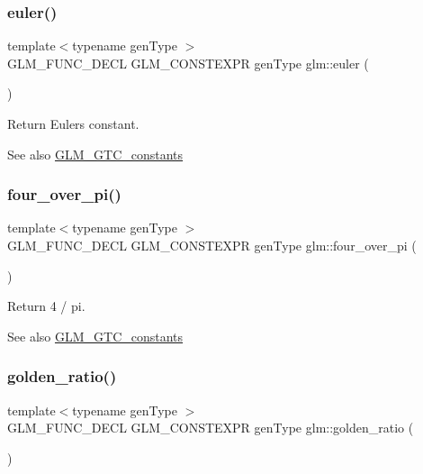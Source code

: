 \subsubsection{\texorpdfstring{euler()}{euler()}}
{\footnotesize\ttfamily template$<$typename gen\+Type $>$ \\
G\+L\+M\+\_\+\+F\+U\+N\+C\+\_\+\+D\+E\+CL G\+L\+M\+\_\+\+C\+O\+N\+S\+T\+E\+X\+PR gen\+Type glm\+::euler (\begin{DoxyParamCaption}{ }\end{DoxyParamCaption})}

Return Euler\textquotesingle{}s constant. \begin{DoxySeeAlso}{See also}
\hyperlink{group__gtc__constants}{G\+L\+M\+\_\+\+G\+T\+C\+\_\+constants} 
\end{DoxySeeAlso}
\mbox{\label{group__gtc__constants_ga753950e5140e4ea6a88e4a18ba61dc09}} 
\subsubsection{\texorpdfstring{four\+\_\+over\+\_\+pi()}{four\_over\_pi()}}
{\footnotesize\ttfamily template$<$typename gen\+Type $>$ \\
G\+L\+M\+\_\+\+F\+U\+N\+C\+\_\+\+D\+E\+CL G\+L\+M\+\_\+\+C\+O\+N\+S\+T\+E\+X\+PR gen\+Type glm\+::four\+\_\+over\+\_\+pi (\begin{DoxyParamCaption}{ }\end{DoxyParamCaption})}

Return 4 / pi. \begin{DoxySeeAlso}{See also}
\hyperlink{group__gtc__constants}{G\+L\+M\+\_\+\+G\+T\+C\+\_\+constants} 
\end{DoxySeeAlso}
\mbox{\label{group__gtc__constants_ga748cf8642830657c5b7eae04d0a80899}} 
\subsubsection{\texorpdfstring{golden\+\_\+ratio()}{golden\_ratio()}}
{\footnotesize\ttfamily template$<$typename gen\+Type $>$ \\
G\+L\+M\+\_\+\+F\+U\+N\+C\+\_\+\+D\+E\+CL G\+L\+M\+\_\+\+C\+O\+N\+S\+T\+E\+X\+PR gen\+Type glm\+::golden\+\_\+ratio (\begin{DoxyParamCaption}{ }\end{DoxyParamCaption})}


